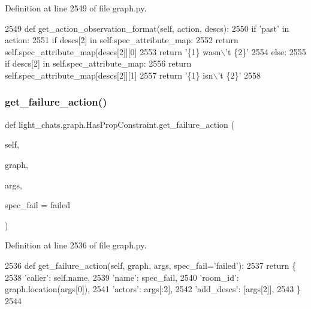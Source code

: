 Definition at line 2549 of file graph.\+py.


\begin{DoxyCode}
2549     \textcolor{keyword}{def }get\_action\_observation\_format(self, action, descs):
2550         \textcolor{keywordflow}{if} \textcolor{stringliteral}{'past'} \textcolor{keywordflow}{in} action:
2551             \textcolor{keywordflow}{if} descs[2] \textcolor{keywordflow}{in} self.spec\_attribute\_map:
2552                 \textcolor{keywordflow}{return} self.spec\_attribute\_map[descs[2]][0]
2553             \textcolor{keywordflow}{return} \textcolor{stringliteral}{'\{1\} wasn\(\backslash\)'t \{2\}'}
2554         \textcolor{keywordflow}{else}:
2555             \textcolor{keywordflow}{if} descs[2] \textcolor{keywordflow}{in} self.spec\_attribute\_map:
2556                 \textcolor{keywordflow}{return} self.spec\_attribute\_map[descs[2]][1]
2557             \textcolor{keywordflow}{return} \textcolor{stringliteral}{'\{1\} isn\(\backslash\)'t \{2\}'}
2558 
\end{DoxyCode}
\mbox{\label{classlight__chats_1_1graph_1_1HasPropConstraint_aff9fe175fee6b71e845e03433593814c}} 
\subsubsection{\texorpdfstring{get\+\_\+failure\+\_\+action()}{get\_failure\_action()}}
{\footnotesize\ttfamily def light\+\_\+chats.\+graph.\+Has\+Prop\+Constraint.\+get\+\_\+failure\+\_\+action (\begin{DoxyParamCaption}\item[{}]{self,  }\item[{}]{graph,  }\item[{}]{args,  }\item[{}]{spec\+\_\+fail = {\ttfamily \textquotesingle{}failed\textquotesingle{}} }\end{DoxyParamCaption})}



Definition at line 2536 of file graph.\+py.


\begin{DoxyCode}
2536     \textcolor{keyword}{def }get\_failure\_action(self, graph, args, spec\_fail='failed'):
2537         \textcolor{keywordflow}{return} \{
2538             \textcolor{stringliteral}{'caller'}: self.name,
2539             \textcolor{stringliteral}{'name'}: spec\_fail,
2540             \textcolor{stringliteral}{'room\_id'}: graph.location(args[0]),
2541             \textcolor{stringliteral}{'actors'}: args[:2],
2542             \textcolor{stringliteral}{'add\_descs'}: [args[2]],
2543         \}
2544 
\end{DoxyCode}


